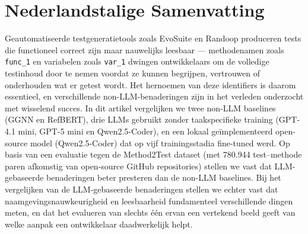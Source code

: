 
\section*{Nederlandstalige Samenvatting}

Geautomatiseerde testgeneratietools zoals EvoSuite en Randoop produceren tests die functioneel correct zijn maar nauwelijks leesbaar --- methodenamen zoals \texttt{func\_1} en variabelen zoals \texttt{var\_1} dwingen ontwikkelaars om de volledige testinhoud door te nemen voordat ze kunnen begrijpen, vertrouwen of onderhouden wat er getest wordt.
Het hernoemen van deze identifiers is daarom essentieel, en verschillende non-LLM-benaderingen zijn in het verleden onderzocht met wisselend succes.
In dit artikel vergelijken we twee non-LLM baselines (GGNN en RefBERT), drie LLMs gebruikt zonder taakspecifieke training (GPT-4.1 mini, GPT-5 mini en Qwen2.5-Coder), en een lokaal geïmplementeerd open-source model (Qwen2.5-Coder) dat op vijf trainingsstadia fine-tuned werd.
Op basis van een evaluatie tegen de Method2Test dataset (met 780.944 test--methode paren afkomstig van open-source GitHub repositories) stellen we vast dat LLM-gebaseerde benaderingen beter presteren dan de non-LLM baselines.
Bij het vergelijken van de LLM-gebaseerde benaderingen stellen we echter vast dat naamgevingsnauwkeurigheid en leesbaarheid fundamenteel verschillende dingen meten, en dat het evalueren van slechts één ervan een vertekend beeld geeft van welke aanpak een ontwikkelaar daadwerkelijk helpt.
